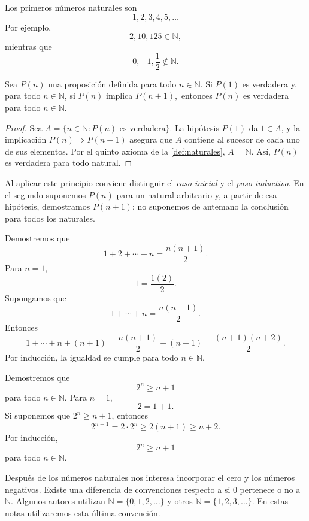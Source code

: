 \begin{example}
Los primeros números naturales son
\[
1,2,3,4,5,\ldots
\]
Por ejemplo,
\[
2,10,125\in\mathbb{N},
\]
mientras que
\[
0,-1,\frac12\notin\mathbb{N}.
\]
\end{example}

\begin{samepage}
\begin{theorem}
\label{teo:induccion}
Sea $P(n)$ una proposición definida para todo $n\in\mathbb{N}$. Si $P(1)$
es verdadera y, para todo $n\in\mathbb{N}$, si $P(n)$ implica $P(n+1),$
entonces $P(n)$ es verdadera para todo $n\in\mathbb{N}$.
\end{theorem}
\end{samepage}

\begin{proof}
Sea $A=\{n\in\mathbb{N}:P(n)\text{ es verdadera}\}$. La hipótesis $P(1)$ da $1\in A$, y la implicación $P(n)\Rightarrow P(n+1)$ asegura que $A$ contiene al sucesor de cada uno de sus elementos. Por el quinto axioma de la \cref{def:naturales}, $A=\mathbb{N}$. Así, $P(n)$ es verdadera para todo natural.
\end{proof}

Al aplicar este principio conviene distinguir el \emph{caso inicial} y el \emph{paso inductivo}. En el segundo suponemos $P(n)$ para un natural arbitrario y, a partir de esa hipótesis, demostramos $P(n+1)$; no suponemos de antemano la conclusión para todos los naturales.

\begin{example}
Demostremos que
\[
1+2+\cdots+n=\frac{n(n+1)}2.
\]
Para $n=1$,
\[
1=\frac{1(2)}2.
\]
Supongamos que
\[
1+\cdots+n=\frac{n(n+1)}2.
\]
Entonces
\[
1+\cdots+n+(n+1)
=\frac{n(n+1)}2+(n+1)
=\frac{(n+1)(n+2)}2.
\]
Por inducción, la igualdad se cumple para todo $n\in\mathbb{N}$.
\end{example}

\begin{example}
Demostremos que
\[
2^n\geq n+1
\]
para todo $n\in\mathbb{N}$. Para $n=1$,
\[
2=1+1.
\]
Si suponemos que $2^n\geq n+1$, entonces
\[
2^{n+1}=2\cdot2^n\geq2(n+1)\geq n+2.
\]
Por inducción,
\[
2^n\geq n+1
\]
para todo $n\in\mathbb{N}$.
\end{example}

Después de los números naturales nos interesa incorporar el cero y los números negativos. Existe una diferencia de convenciones respecto a si $0$ pertenece o no a $\mathbb{N}$. Algunos autores utilizan $\mathbb{N}=\{0,1,2,\ldots\}$ y otros $\mathbb{N}=\{1,2,3,\ldots\}$. En estas notas utilizaremos esta última convención.

